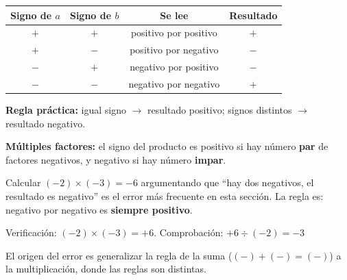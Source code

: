 \documentclass[11pt, letterpaper]{article}
\begin{document}
\begin{tcolorbox}[importantbox, title={Regla de los signos --- multiplicaci\'on}]
\begin{center}
\renewcommand{\arraystretch}{1.4}
\begin{tabular}{ccc|c}
\toprule
\textbf{Signo de }$a$ & \textbf{Signo de }$b$ & \textbf{Se lee} & \textbf{Resultado}\\
\midrule
$+$ & $+$ & positivo por positivo & $+$\\
$+$ & $-$ & positivo por negativo & $-$\\
$-$ & $+$ & negativo por positivo & $-$\\
$-$ & $-$ & negativo por negativo & $+$\\
\bottomrule
\end{tabular}
\end{center}
\medskip
\textbf{Regla pr\'actica:} igual signo $\to$ resultado positivo; signos distintos $\to$ resultado negativo.

\textbf{M\'ultiples factores:} el signo del producto es positivo si hay n\'umero \textbf{par} de factores negativos, y negativo si hay n\'umero \textbf{impar}.
\end{tcolorbox}

\begin{tcolorbox}[warningbox, title={Error frecuente --- el signo del producto de dos negativos}]
Calcular $(-2)\times(-3)=-6$ argumentando que ``hay dos negativos, el resultado es negativo'' es el error m\'as frecuente en esta secci\'on. La regla es: negativo por negativo es \textbf{siempre positivo}.

Verificaci\'on: $(-2)\times(-3)=+6$. Comprobaci\'on: $+6\div(-2)=-3$ \checkmark

El origen del error es generalizar la regla de la suma ($(-)+(-) = (-)$) a la multiplicaci\'on, donde las reglas son distintas.
\end{tcolorbox}
\end{document}
